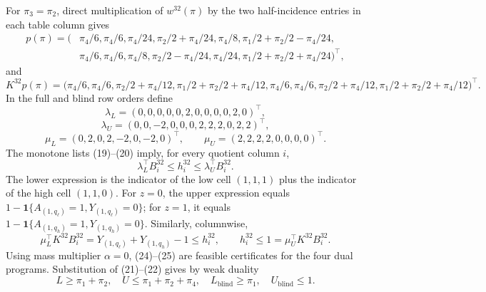 For \(\pi_3=\pi_2\), direct multiplication of \(w^{32}(\pi)\) by the two half-incidence entries in each table column gives
\[
\begin{split}
p(\pi)=\bigl(&\pi_4/6,\pi_4/6,\pi_4/24,\pi_2/2+\pi_4/24,\pi_4/8,
\pi_1/2+\pi_2/2-\pi_4/24,\\
&\pi_4/6,\pi_4/6,\pi_4/8,\pi_2/2-\pi_4/24,\pi_4/24,
\pi_1/2+\pi_2/2+\pi_4/24\bigr)^{\top},
\end{split}
\tag{21}
\]
and
\[
K^{32}p(\pi)=\bigl(\pi_4/6,\pi_4/6,\pi_2/2+\pi_4/12,
\pi_1/2+\pi_2/2+\pi_4/12,\pi_4/6,\pi_4/6,
\pi_2/2+\pi_4/12,\pi_1/2+\pi_2/2+\pi_4/12\bigr)^{\top}.
\tag{22}
\]
In the full and blind row orders define
\[
\lambda_L=(0,0,0,0,0,2,0,0,0,0,2,0)^{\top},
\]
\[
\lambda_U=(0,0,-2,0,0,0,2,2,2,0,2,2)^{\top},
\]
\[
\mu_L=(0,2,0,2,-2,0,-2,0)^{\top},\qquad
\mu_U=(2,2,2,2,0,0,0,0)^{\top}.
\tag{23}
\]
The monotone lists (19)--(20) imply, for every quotient column \(i\),
\[
\lambda_L^{\top}B^{32}_i\leq h^{32}_i\leq\lambda_U^{\top}B^{32}_i.
\tag{24}
\]
The lower expression is the indicator of the low cell \((1,1,1)\) plus the indicator of the high cell \((1,1,0)\).  For \(z=0\), the upper expression equals \(1-\mathbf 1\{A_{(1,q_\ell)}=1,Y_{(1,q_\ell)}=0\}\); for \(z=1\), it equals \(1-\mathbf 1\{A_{(1,q_h)}=1,Y_{(1,q_h)}=0\}\).  Similarly, columnwise,
\[
\mu_L^{\top}K^{32}B^{32}_i
=Y_{(1,q_\ell)}+Y_{(1,q_h)}-1\leq h^{32}_i,
\qquad
h^{32}_i\leq1=\mu_U^{\top}K^{32}B^{32}_i.
\tag{25}
\]
Using mass multiplier \(\alpha=0\), (24)--(25) are feasible certificates for the four dual programs.  Substitution of (21)--(22) gives by weak duality
\[
L\geq\pi_1+\pi_2,\quad U\leq\pi_1+\pi_2+\pi_4,
\quad L_{\mathrm{blind}}\geq\pi_1,\quad U_{\mathrm{blind}}\leq1.
\tag{26}
\]

